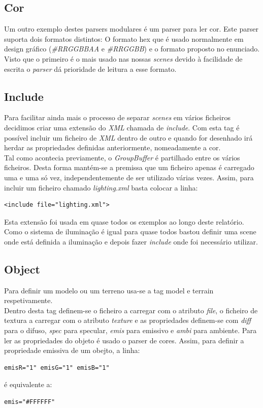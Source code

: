 \documentclass[a4paper]{report}
\begin{document}
\subsection{Cor}
Um outro exemplo destes parsers modulares é um parser para ler cor. Este parser
suporta dois formatos distintos: O formato hex que é usado normalmente em design
gráfico (\textit{\#RRGGBBAA} e \textit{\#RRGGBB}) e o formato proposto no
enunciado. Visto que o primeiro é o mais usado nas nossas \textit{scenes} devido
à facilidade de escrita o \textit{parser} dá prioridade de leitura a esse
formato.

\subsection{Include}
Para facilitar ainda mais o processo de separar \textit{scenes} em vários
ficheiros decidimos criar uma extensão do \textit{XML} chamada de
\textit{include}. Com esta tag é possível incluir um ficheiro de \textit{XML}
dentro de outro e quando for desenhado irá herdar as propriedades definidas
anteriormente, nomeadamente a cor.\\
Tal como acontecia previamente, o \textit{GroupBuffer} é partilhado entre os
vários ficheiros. Desta forma mantém-se a premissa que um ficheiro apenas é
carregado uma e uma só vez, independentemente de ser utilizado várias vezes.
Assim, para incluir um ficheiro chamado \textit{lighting.xml} basta colocar a
linha:

\begin{lstlisting}
<include file="lighting.xml">
\end{lstlisting}
Esta extensão foi usada em quase todos os exemplos ao longo deste relatório.
Como o sistema de iluminação é igual para quase todos bastou definir uma scene
onde está definida a iluminação e depois fazer \textit{include} onde foi
necessário utilizar.

\subsection{Object}
Para definir um modelo ou um terreno usa-se a tag model e terrain
respetivamente.\\
Dentro desta tag definem-se o ficheiro a carregar com o atributo \textit{file},
o ficheiro de textura a carregar com o atributo \textit{texture} e as
propriedades definem-se com \textit{diff} para o difuso, \textit{spec} para
specular, \textit{emis} para emissivo e \textit{ambi} para ambiente. Para ler as
propriedades do objeto é usado o parser de cores. Assim, para definir a
propriedade emissiva de um obejto, a linha:
\begin{lstlisting}
emisR="1" emisG="1" emisB="1"
\end{lstlisting}
é equivalente a:
\begin{lstlisting}
emis="#FFFFFF"
\end{lstlisting}
\end{document}
